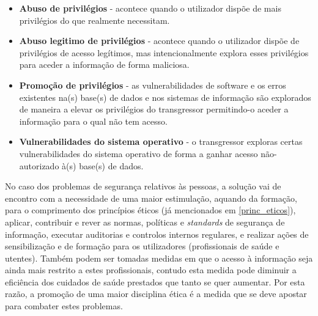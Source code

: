 \documentclass[conference]{IEEEtran}
\begin{document}
\begin{itemize}

	\item \textbf{Abuso de privilégios} - acontece quando o utilizador dispõe de mais privilégios do que realmente necessitam.
	
	\item \textbf{Abuso legitimo de privilégios} - acontece quando o utilizador dispõe de privilégios de acesso legítimos, mas intencionalmente explora esses privilégios para aceder a informação de forma maliciosa.
	
	\item \textbf{Promoção de privilégios} - as vulnerabilidades de software e os erros existentes na(s) base(s) de dados e nos sistemas de informação são explorados de maneira a elevar os privilégios do transgressor permitindo-o aceder a informação para o qual não tem acesso.
	
	\item \textbf{Vulnerabilidades do sistema operativo} - o transgressor exploras certas vulnerabilidades do sistema operativo de forma a ganhar acesso não-autorizado à(s) base(s) de dados.

\end{itemize}

No caso dos problemas de segurança relativos às pessoas, a solução vai de encontro com a necessidade de uma maior estimulação, aquando da formação, para o comprimento dos princípios éticos (já mencionados em \ref{princ_eticos}), aplicar, contribuir e rever as normas, políticas e \textit{standards} de segurança de informação, executar auditorias e controlos internos regulares, e realizar ações de sensibilização e de formação para os utilizadores (profissionais de saúde e utentes). Também podem ser tomadas medidas em que o acesso à informação seja ainda mais restrito a estes profissionais, contudo esta medida pode diminuir a eficiência dos cuidados de saúde prestados que tanto se quer aumentar. Por esta razão, a promoção de uma maior disciplina ética é a medida que se deve apostar para combater estes problemas.
\end{document}
